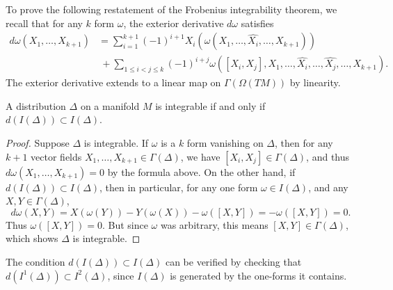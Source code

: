 To prove the following restatement of the Frobenius integrability theorem, we recall that for any $k$ form $\omega$, the exterior derivative $d\omega$ satisfies
%
\begin{align*}
    d\omega(X_1, \dots, X_{k+1}) &= \sum_{i=1}^{k+1} (-1)^{i+1} X_i(\omega(X_1, \dots, \widehat{X_i}, \dots, X_{k+1}))\\
    &\ + \sum_{1 \leq i < j \leq k} (-1)^{i+j} \omega([X_i,X_j], X_1, \dots, \widehat{X_i}, \dots, \widehat{X_j}, \dots, X_{k+1}).
\end{align*}
%
The exterior derivative extends to a linear map on $\Gamma(\Omega(TM))$ by linearity.

\begin{theorem}
    A distribution $\Delta$ on a manifold $M$ is integrable if and only if $d(I(\Delta)) \subset I(\Delta)$.
\end{theorem}
\begin{proof}
    Suppose $\Delta$ is integrable. If $\omega$ is a $k$ form vanishing on $\Delta$, then for any $k+1$ vector fields $X_1, \dots, X_{k+1} \in \Gamma(\Delta)$, we have $[X_i,X_j] \in \Gamma(\Delta)$, and thus $d\omega(X_1, \dots, X_{k+1}) = 0$ by the formula above. On the other hand, if $d(I(\Delta)) \subset I(\Delta)$, then in particular, for any one form $\omega \in I(\Delta)$, and any $X,Y \in \Gamma(\Delta)$,
    \[ d\omega(X,Y) = X(\omega(Y)) - Y(\omega(X)) - \omega([X,Y]) = - \omega([X,Y]) = 0. \]
    Thus $\omega([X,Y]) = 0$. But since $\omega$ was arbitrary, this means $[X,Y] \in \Gamma(\Delta)$, which shows $\Delta$ is integrable. 
\end{proof}

\begin{remark}
    The condition $d(I(\Delta)) \subset I(\Delta)$ can be verified by checking that $d(I^1(\Delta)) \subset I^2(\Delta)$, since $I(\Delta)$ is generated by the one-forms it contains.
\end{remark}

